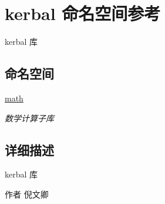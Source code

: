 \hypertarget{namespacekerbal}{}\section{kerbal 命名空间参考}
\label{namespacekerbal}


kerbal 库  


\subsection*{命名空间}
\begin{DoxyCompactItemize}
\item 
 \hyperlink{namespacekerbal_1_1math}{math}
\begin{DoxyCompactList}\small\item\em 数学计算子库 \end{DoxyCompactList}\end{DoxyCompactItemize}


\subsection{详细描述}
kerbal 库 

\begin{DoxyAuthor}{作者}
倪文卿 
\end{DoxyAuthor}

